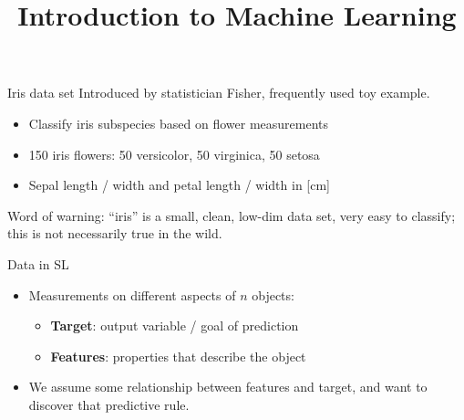 \documentclass[11pt,compress,t,notes=noshow, xcolor=table]{beamer}
\title{Introduction to Machine Learning}
\begin{document}


\begin{frame}{Iris data set}
Introduced by statistician Fisher,  frequently used toy example.
\begin{itemize}
\item Classify iris subspecies based on flower measurements
\item 150 iris flowers: 50 versicolor, 50 virginica, 50 setosa
\item Sepal length / width and petal length / width in [cm]
\end{itemize}
Word of warning: ``iris'' is a small, clean, low-dim data set, very easy to classify; this is not necessarily true in the wild. 
\end{frame}


\begin{frame}{Data in SL}
\begin{itemize}
\item Measurements on different aspects of $n$ objects:
\begin{itemize}
  \item \textbf{Target}: output variable / goal of prediction
  \item \textbf{Features}: properties that describe the object
\end{itemize}
\item We assume some relationship between features and target, and want to discover that predictive rule.
\end{itemize}
\vfill
{}
{
 
}
\end{frame}
\end{document}
